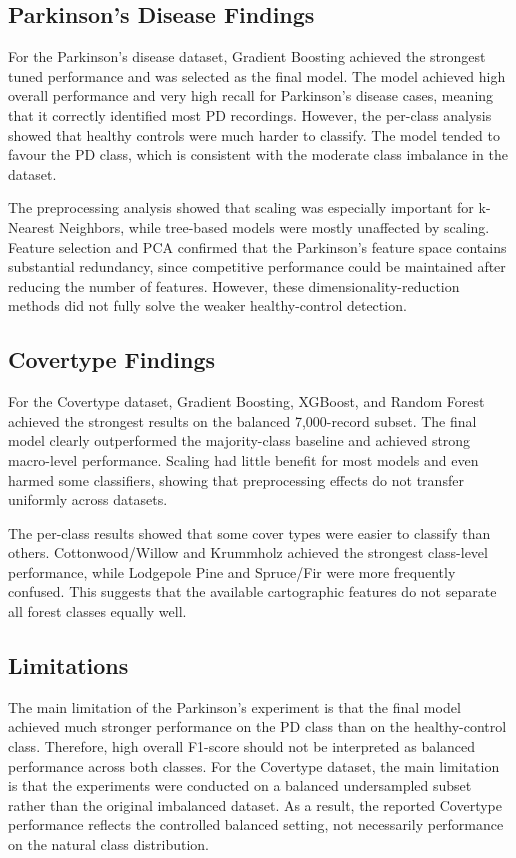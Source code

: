 \documentclass[11pt,a4paper]{article}
\begin{document}
\subsection{Parkinson's Disease Findings}

For the Parkinson's disease dataset, Gradient Boosting achieved the
strongest tuned performance and was selected as the final model. The
model achieved high overall performance and very high recall for
Parkinson's disease cases, meaning that it correctly identified most PD
recordings. However, the per-class analysis showed that healthy controls
were much harder to classify. The model tended to favour the PD class,
which is consistent with the moderate class imbalance in the dataset.

The preprocessing analysis showed that scaling was especially important
for k-Nearest Neighbors, while tree-based models were mostly unaffected by
scaling. Feature selection and PCA confirmed that the Parkinson's feature
space contains substantial redundancy, since competitive performance could
be maintained after reducing the number of features. However, these
dimensionality-reduction methods did not fully solve the weaker
healthy-control detection.

\subsection{Covertype Findings}

For the Covertype dataset, Gradient Boosting, XGBoost, and Random Forest
achieved the strongest results on the balanced 7,000-record subset. The
final model clearly outperformed the majority-class baseline and achieved
strong macro-level performance. Scaling had little benefit for most models
and even harmed some classifiers, showing that preprocessing effects do
not transfer uniformly across datasets.

The per-class results showed that some cover types were easier to classify
than others. Cottonwood/Willow and Krummholz achieved the strongest
class-level performance, while Lodgepole Pine and Spruce/Fir were more
frequently confused. This suggests that the available cartographic features
do not separate all forest classes equally well.

\subsection{Limitations}

The main limitation of the Parkinson's experiment is that the final model
achieved much stronger performance on the PD class than on the
healthy-control class. Therefore, high overall F1-score should not be
interpreted as balanced performance across both classes. For the Covertype
dataset, the main limitation is that the experiments were conducted on a
balanced undersampled subset rather than the original imbalanced dataset.
As a result, the reported Covertype performance reflects the controlled
balanced setting, not necessarily performance on the natural class
distribution.
\end{document}
